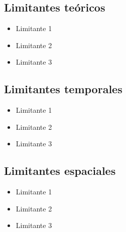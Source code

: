 \subsection{Limitantes teóricos}

\begin{itemize}
  \item Limitante 1
  \item Limitante 2
  \item Limitante 3
\end{itemize}

\subsection{Limitantes temporales}

\begin{itemize}
  \item Limitante 1
  \item Limitante 2
  \item Limitante 3
\end{itemize}

\subsection{Limitantes espaciales}

\begin{itemize}
  \item Limitante 1
  \item Limitante 2
  \item Limitante 3
\end{itemize}
